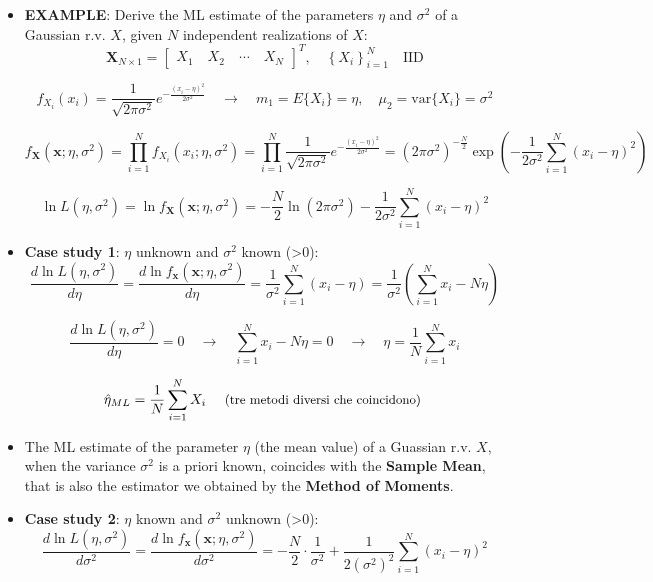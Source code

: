 \begin{itemize}
\begin{itemize}
        \item There is no guarantee that the ML estimator is efficient, but if an efficient estimator exists, it is the ML estimator.
        \item The concept of \textbf{efficiency} is related to the definition of the so-called \textbf{Cramèr-Rao lower bound (CRB)}, that we will introduce in the following.
    \end{itemize}
    \item \textbf{EXAMPLE}: Derive the ML estimate of the parameters \(\eta\) and \(\sigma^2\) of a Gaussian r.v. \(X\), given \(N\) independent realizations of \(X\):
    \[
    \mathbf{X}_{N \times 1} = \begin{bmatrix}
    X_1 \quad X_2 \quad \cdots \quad X_N
    \end{bmatrix}^T,
    \quad \left\{ X_i \right\}_{i=1}^N \quad \text{IID}
    \]

    \[
    f_{X_i}(x_i) = \frac{1}{\sqrt{2\pi \sigma^2}} e^{- \frac{(x_i - \eta)^2}{2 \sigma^2}}
    \quad \rightarrow \quad
    m_1 = E\{X_i\} = \eta, \quad \mu_2 = \mathrm{var}\{X_i\} = \sigma^2
    \]

    \[
    f_{\mathbf{X}}(\mathbf{x}; \eta, \sigma^2) = \prod_{i=1}^{N} f_{X_i}(x_i; \eta, \sigma^2) =
    \prod_{i=1}^N \frac{1}{\sqrt{2\pi \sigma^2}} e^{- \frac{(x_i - \eta)^2}{2 \sigma^2}}
    = (2\pi \sigma^2)^{-\frac{N}{2}} \exp \left( -\frac{1}{2\sigma^2} \sum_{i=1}^N (x_i - \eta)^2 \right)
    \]

    \[
    \ln L(\eta, \sigma^2) = \ln f_{\mathbf{X}}(\mathbf{x}; \eta, \sigma^2) =
    - \frac{N}{2} \ln (2\pi \sigma^2) - \frac{1}{2\sigma^2} \sum_{i=1}^N (x_i - \eta)^2
    \]
    \item \textbf{Case study 1}: \(\eta\) unknown and \(\sigma^2\) known (>0):
    \[
    \frac{d \ln L(\eta, \sigma^2)}{d \eta}
    = \frac{d \ln f_{\mathbf{x}}(\mathbf{x}; \eta, \sigma^2)}{d\eta}
    = \frac{1}{\sigma^2} \sum_{i=1}^{N} (x_i - \eta)
    = \frac{1}{\sigma^2} \left( \sum_{i=1}^{N} x_i - N\eta \right)
    \]

    \[
    \frac{d \ln L(\eta, \sigma^2)}{d \eta} = 0
    \quad \rightarrow \quad
    \sum_{i=1}^{N} x_i - N\eta = 0
    \quad \rightarrow \quad
    \eta = \frac{1}{N} \sum_{i=1}^{N} x_i
    \]

    \[
    \hat{\eta}_{ML} = \frac{1}{N} \sum_{i=1}^{N} X_i
    \quad \text{ \small{(tre metodi diversi che coincidono)} }
    \]
    \item The ML estimate of the parameter \(\eta\) (the mean value) of a Guassian r.v. \(X\), when the variance \(\sigma^2\) is a priori known, coincides with the \textbf{Sample Mean}, that is also the estimator we obtained by the \textbf{Method of Moments}.
    \item \textbf{Case study 2}: \(\eta\) known and \(\sigma^2\) unknown (>0):
\[
\frac{d \ln L(\eta, \sigma^2)}{d \sigma^2}
= \frac{d \ln f_{\mathbf{x}}(\mathbf{x}; \eta, \sigma^2)}{d \sigma^2}
= -\frac{N}{2} \cdot \frac{1}{\sigma^2}
+ \frac{1}{2 (\sigma^2)^2} \sum_{i=1}^N (x_i - \eta)^2
\]


\end{itemize}
